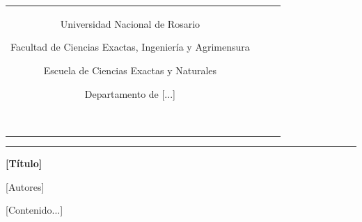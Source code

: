 \documentclass[12pt, spanish]{article}
\begin{document}
\begin{titlepage}
\begin{tabular}{cc}
\begin{minipage}{0.3\textwidth}
    	\end{minipage}
    	\begin{minipage}{0.7\textwidth}   
    		\begin{flushright}
                {\small
    			Universidad Nacional de Rosario$\;\;\;\;\;\;$\par
    			Facultad de Ciencias Exactas, Ingeniería y Agrimensura$\;\;\;\;\;\;$\par
    			Escuela de Ciencias Exactas y Naturales$\;\;\;\;\;\;$\par
    			Departamento de [...]$\;\;\;\;\;\;$\par
    			[Materia]$\;\;\;\;\;\;$\par
                }
    		\end{flushright}
    		   \vspace{.5pt} 
    	\end{minipage} 
    \end{tabular} 
    \noindent\rule{\textwidth}{0.4pt}
    \begin{center}   
    	\vspace{.4cm}
    	\noindent\textbf{\LARGE [Título] } \par
    	\normalsize
    	\begin{center}
    		  [Autores]\\
    	\end{center}
    \end{center}

    [Contenido...]
\end{titlepage}
\end{document}
